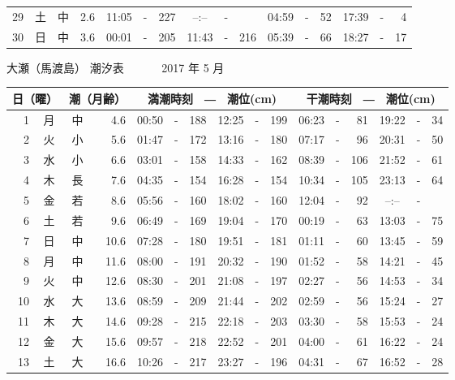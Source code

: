 \documentclass[12pt.a4j]{jsarticle}
\begin{document}
\begin{center}
\begin{table}[ht]
\begin{tabular}{|rc|cr|ccrccr|ccrccr|}
29 & 土 & 中 &  2.6 &  11:05 &-& 227  &  --:-- &-&     &   04:59 &-&  52  &   17:39 &-&   4  \\
30 & 日 & 中 &  3.6 &  00:01 &-& 205  &  11:43 &-& 216  &   05:39 &-&  66  &   18:27 &-&  17  \\
   \hline
   \end{tabular}
\end{table}
\newpage
 {\LARGE 大瀬（馬渡島）  潮汐表　　　}
 {\large 2017 年  5 月}\\
 \begin{table}[ht]
    \begin{tabular}{|rc|cr|ccrccr|ccrccr|}
    \hline
    \multicolumn{2}{|c|}{日（曜）} & \multicolumn{2}{c|}{潮（月齢）} & \multicolumn{6}{c|}{満潮時刻　―　潮位(cm)} & \multicolumn{6}{c|}{干潮時刻　―　潮位(cm)} \\
 \hline
 1 & 月 & 中 &  4.6 &  00:50 &-& 188  &  12:25 &-& 199  &   06:23 &-&  81  &   19:22 &-&  34  \\
 2 & 火 & 小 &  5.6 &  01:47 &-& 172  &  13:16 &-& 180  &   07:17 &-&  96  &   20:31 &-&  50  \\
 3 & 水 & 小 &  6.6 &  03:01 &-& 158  &  14:33 &-& 162  &   08:39 &-& 106  &   21:52 &-&  61  \\
 4 & 木 & 長 &  7.6 &  04:35 &-& 154  &  16:28 &-& 154  &   10:34 &-& 105  &   23:13 &-&  64  \\
 5 & 金 & 若 &  8.6 &  05:56 &-& 160  &  18:02 &-& 160  &   12:04 &-&  92  &   --:-- &-&     \\
 6 & 土 & 若 &  9.6 &  06:49 &-& 169  &  19:04 &-& 170  &   00:19 &-&  63  &   13:03 &-&  75  \\
 7 & 日 & 中 & 10.6 &  07:28 &-& 180  &  19:51 &-& 181  &   01:11 &-&  60  &   13:45 &-&  59  \\
 8 & 月 & 中 & 11.6 &  08:00 &-& 191  &  20:32 &-& 190  &   01:52 &-&  58  &   14:21 &-&  45  \\
 9 & 火 & 中 & 12.6 &  08:30 &-& 201  &  21:08 &-& 197  &   02:27 &-&  56  &   14:53 &-&  34  \\
10 & 水 & 大 & 13.6 &  08:59 &-& 209  &  21:44 &-& 202  &   02:59 &-&  56  &   15:24 &-&  27  \\
11 & 木 & 大 & 14.6 &  09:28 &-& 215  &  22:18 &-& 203  &   03:30 &-&  58  &   15:53 &-&  24  \\
12 & 金 & 大 & 15.6 &  09:57 &-& 218  &  22:52 &-& 201  &   04:00 &-&  61  &   16:22 &-&  24  \\
13 & 土 & 大 & 16.6 &  10:26 &-& 217  &  23:27 &-& 196  &   04:31 &-&  67  &   16:52 &-&  28  \\

\end{tabular}
\end{table}
\end{center}
\end{document}

